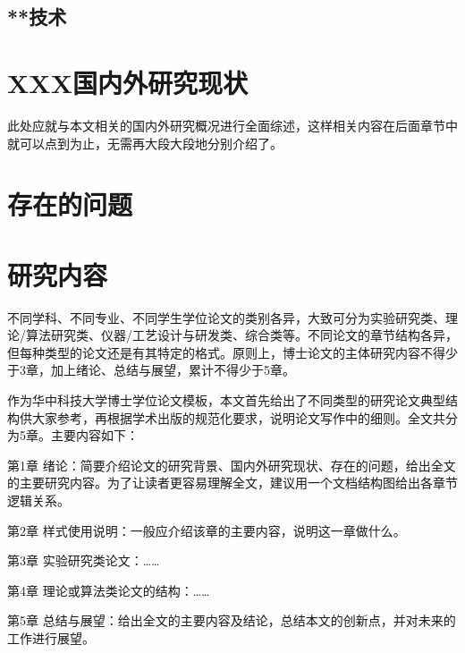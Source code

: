 \subsection{**技术}



\section{XXX国内外研究现状}
\label{sec:requirement}

此处应就与本文相关的国内外研究概况进行全面综述，这样相关内容在后面章节中就可以点到为止，无需再大段大段地分别介绍了。

\section{存在的问题}
\label{sec:compile}

\section{研究内容}
\label{sec:xelatex}
不同学科、不同专业、不同学生学位论文的类别各异，大致可分为实验研究类、理论/算法研究类、仪器/工艺设计与研发类、综合类等。不同论文的章节结构各异，但每种类型的论文还是有其特定的格式。原则上，博士论文的主体研究内容不得少于3章，加上绪论、总结与展望，累计不得少于5章。

作为华中科技大学博士学位论文模板，本文首先给出了不同类型的研究论文典型结构供大家参考，再根据学术出版的规范化要求，说明论文写作中的细则。全文共分为5章。主要内容如下：

第1章 绪论：简要介绍论文的研究背景、国内外研究现状、存在的问题，给出全文的主要研究内容。为了让读者更容易理解全文，建议用一个文档结构图给出各章节逻辑关系。

第2章 样式使用说明：一般应介绍该章的主要内容，说明这一章做什么。

第3章 实验研究类论文：……

第4章 理论或算法类论文的结构：……

第5章 总结与展望：给出全文的主要内容及结论，总结本文的创新点，并对未来的工作进行展望。
